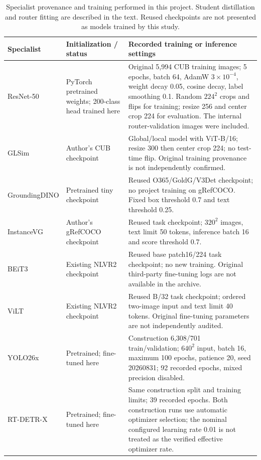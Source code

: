 \begin{table}[H]
\centering
\caption{Specialist provenance and training performed in this project. Student distillation and router fitting are described in the text. Reused checkpoints are not presented as models trained by this study.}
\label{tab:training}
\small
\begin{tabular}{@{}>{\raggedright\arraybackslash}p{2.3cm}>{\raggedright\arraybackslash}p{3.2cm}>{\raggedright\arraybackslash}p{11.1cm}@{}}
\toprule
Specialist & Initialization / status & Recorded training or inference settings \\
\midrule
ResNet-50 & PyTorch pretrained weights; 200-class head trained here & Original 5,994 CUB training images; 5 epochs, batch 64, AdamW $3\!\times\!10^{-4}$, weight decay 0.05, cosine decay, label smoothing 0.1. Random $224^2$ crops and flips for training; resize 256 and center crop 224 for evaluation. The internal router-validation images were included. \\
GLSim & Author's CUB checkpoint & Global/local model with ViT-B/16; resize 300 then center crop 224; no test-time flip. Original training provenance is not independently confirmed. \\
GroundingDINO & Pretrained tiny checkpoint & Reused O365/GoldG/V3Det checkpoint; no project training on gRefCOCO. Fixed box threshold 0.7 and text threshold 0.25. \\
InstanceVG & Author's gRefCOCO checkpoint & Reused task checkpoint; $320^2$ images, text limit 50 tokens, inference batch 16 and score threshold 0.7. \\
BEiT3 & Existing NLVR2 checkpoint & Reused base patch16/224 task checkpoint; no new training. Original third-party fine-tuning logs are not available in the archive. \\
ViLT & Existing NLVR2 checkpoint & Reused B/32 task checkpoint; ordered two-image input and text limit 40 tokens. Original fine-tuning parameters are not independently audited. \\
YOLO26x & Pretrained; fine-tuned here & Construction 6,308/701 train/validation; $640^2$ input, batch 16, maximum 100 epochs, patience 20, seed 20260831; 92 recorded epochs, mixed precision disabled. \\
RT-DETR-X & Pretrained; fine-tuned here & Same construction split and training limits; 39 recorded epochs. Both construction runs use automatic optimizer selection; the nominal configured learning rate 0.01 is not treated as the verified effective optimizer rate. \\
\bottomrule
\end{tabular}
\end{table}
